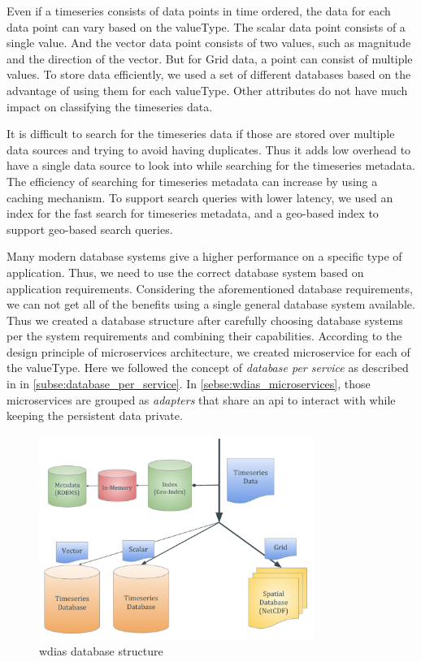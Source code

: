 Even if a timeseries consists of data points in time ordered, the data for each data point can vary based on the valueType. The scalar data point consists of a single value. And the vector data point consists of two values, such as magnitude and the direction of the vector. But for Grid data, a point can consist of multiple values. To store data efficiently, we used a set of different databases based on the advantage of using them for each valueType. Other attributes do not have much impact on classifying the timeseries data.

It is difficult to search for the timeseries data if those are stored over multiple data sources and trying to avoid having duplicates. Thus it adds low overhead to have a single data source to look into while searching for the timeseries metadata. The efficiency of searching for timeseries metadata can increase by using a caching mechanism. To support search queries with lower latency, we used an index for the fast search for timeseries metadata, and a geo-based index to support geo-based search queries.

Many modern database systems give a higher performance on a specific type of application. Thus, we need to use the correct database system based on application requirements. Considering the aforementioned database requirements, we can not get all of the benefits using a single general database system available. Thus we created a database structure after carefully choosing database systems per the system requirements and combining their capabilities. According to the design principle of microservices architecture, we created microservice for each of the valueType. Here we followed the concept of \emph{database per service} as described in in \cref{subse:database_per_service}. In \cref{sebse:wdias_microservices}, those microservices are grouped as \emph{adapters} that share an \acrshort{api} to interact with while keeping the persistent data private.

\begin{figure}[htp]
    \centering
    \includegraphics[width=0.8\textwidth]{method/microservice/wdias_database_structure.pdf}
    \caption{\acrshort{wdias} database structure}
    \label{fi:database_structure}
\end{figure}

